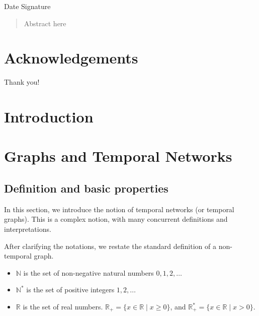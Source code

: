 \documentclass[a4paper,11pt,openany,extrafontsizes]{memoir}
\begin{document}
\begin{center}
  Date \hspace{.5\linewidth} Signature
\end{center}


\cleardoublepage%

\begin{abstract}
  Abstract here
\end{abstract}

\cleardoublepage%

\chapter*{Acknowledgements}%
\label{cha:acknowledgements}

Thank you!

\cleardoublepage%

\tableofcontents
\listoffigures

\clearpage

\mainmatter%

\chapter{Introduction}%
\label{cha:introduction}


\chapter{Graphs and Temporal Networks}%
\label{cha:temporal-networks}

\section{Definition and basic properties}%
\label{sec:defin-basic-prop}

In this section, we introduce the notion of temporal networks (or
temporal graphs). This is a complex notion, with many concurrent
definitions and interpretations.

After clarifying the notations, we restate the standard definition of
a non-temporal graph.

\begin{notation}
  \begin{itemize}
  \item $\mathbb{N}$ is the set of non-negative natural numbers
    $0,1,2,\ldots$ 
  \item $\mathbb{N}^*$ is the set of positive integers $1,2,\ldots$
  \item $\mathbb{R}$ is the set of real numbers.
    $\mathbb{R}_+ = \{x\in\mathbb{R} \;|\; x\geq 0\}$, and
    $\mathbb{R}_+^* = \{x\in\mathbb{R} \;|\; x>0\}$.
\end{itemize}
\end{notation}
\end{document}
